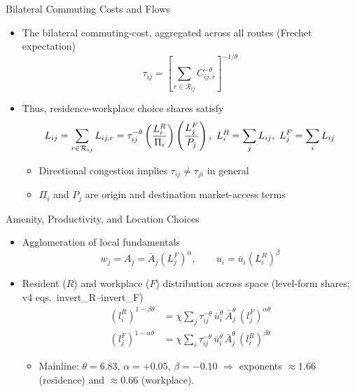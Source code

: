\documentclass[11pt,aspectratio=169]{beamer}
\newcommand{\R}{\mathcal{R}}
\begin{document}
\begin{frame}{Bilateral Commuting Costs and Flows}
\begin{itemize}
  \item The bilateral commuting-cost, aggregated across all routes (Frechet expectation)
  \vspace{-0.5em}\begin{equation}
    \tau_{ij} = \left[ \sum_{r\in\R_{ij}} C_{ij,r}^{-\theta} \right]^{-1/\theta}
  \end{equation}
  \item Thus, residence-workplace choice shares satisfy
  \vspace{-0.25em}\begin{equation}\label{eq:gravity}
    L_{ij} = \sum_{r\in\R_{ij}}L_{ij,r} = \tau_{ij}^{-\theta} \left(\frac{L_i^R}{\Pi_i}\right) \left(\frac{L_j^F}{P_j}\right), \,\, L_i^R=\sum_jL_{ij}, \,\, L_j^F=\sum_iL_{ij}
  \vspace{-1em}\end{equation}
  \begin{itemize}
    \item Directional congestion implies $\tau_{ij}\neq\tau_{ji}$ in general
    \item $\Pi_i$ and $P_j$ are origin and destination market-access terms
  \end{itemize}
\end{itemize}
\end{frame}

\begin{frame}{Amenity, Productivity, and Location Choices}
\begin{itemize}
  \item Agglomeration of local fundamentals
  \vspace{-0.5em}\begin{equation}\label{eq:agglom}
    w_j = A_j = \bar A_j\left(L_j^F\right)^\alpha, \qquad u_i=\bar u_i\left(L_i^R\right)^\beta
  \end{equation}
  \item Resident ($R$) and workplace ($F$) distribution across space (level-form shares; v4 eqs.\ invert\_R--invert\_F)
  \begin{align}
  (l_i^R)^{1-\beta\theta} & = \chi \sum_j\tau_{ij}^{-\theta}\,\bar u_i^{\theta}\,\bar A_j^{\theta}\,(l_j^F)^{\alpha\theta} \label{eq:clear1} \\
  (l_j^F)^{1-\alpha\theta} & = \chi \sum_i\tau_{ij}^{-\theta}\,\bar u_i^{\theta}\,\bar A_j^{\theta}\,(l_i^R)^{\beta\theta} \label{eq:clear2}
  \end{align}
  \begin{itemize}\footnotesize
    \item Mainline: $\theta=6.83$, $\alpha=+0.05$, $\beta=-0.10$ $\Rightarrow$ exponents $\approx 1.66$ (residence) and $\approx 0.66$ (workplace).
  \end{itemize}
\end{itemize}
\end{frame}
\end{document}
